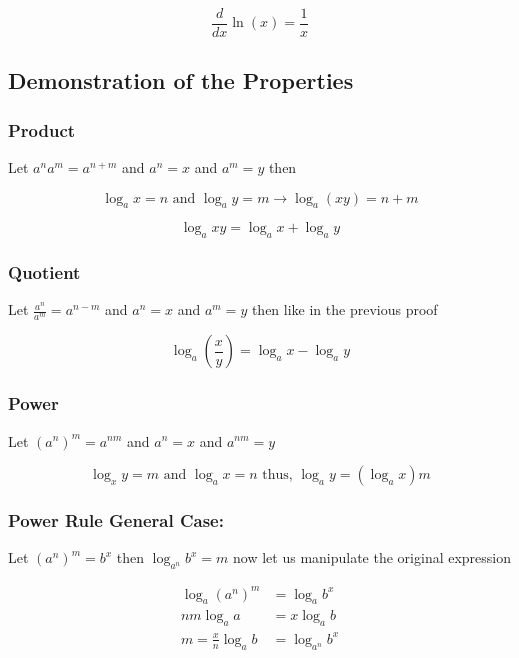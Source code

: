 \[
    \frac{d}{dx} \ln(x) = \frac{1}{x}
\]

\QED

\subsection{Demonstration of the Properties}

\subsubsection{Product}

Let \(a^n a^m = a^{n + m}\) and \(a^n = x\) and \(a^m = y\) then

\[
    \log_a x = n \text{ and } \log_a y = m \rightarrow \log_a (xy) = n + m
\]

\[
    \log_a xy = \log_a x + \log_a y
\]

\QED

\subsubsection{Quotient}

Let \(\frac{a^n}{a^m} = a^{n - m}\) and \(a^n = x\) and \(a^m = y\) then like in the previous proof

\[
    \log_a \left(\frac{x}{y}\right) = \log_a x - \log_a y
\]

\QED 

\subsubsection{Power}

Let \({(a^n)}^m = a^{nm}\) and \(a^n = x\) and \(a^{nm} = y\)

\[
    \log_x y = m \text{ and } \log_a x = n \text{ thus, } \log_a y = (\log_a x )m
\]

\QED

\subsubsection{Power Rule General Case:}

Let \({(a^n)}^m = b^x\) then \(\log_{a^n} b^x = m\) now let us manipulate the original expression

\begin{align*}
    \log_a {(a^n)}^m &= \log_a b^x\\
    nm \log_a a &= x \log_a b\\
    m = \frac{x}{n} \log_a b &=  \log_{a^n} b^x 
\end{align*}

\QED
